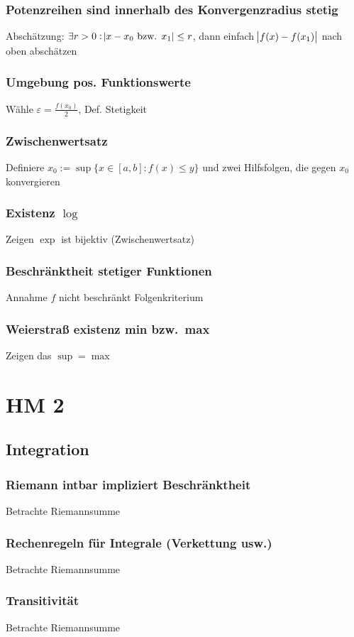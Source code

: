 \subsection{Potenzreihen sind innerhalb des Konvergenzradius stetig }
 Abschätzung: $\exists r>0 : \abs{x-x_0 \text{ bzw. }
 x_1} \leq r$, dann einfach $\abs{f(x)-f(x_1)}$ nach oben abschätzen
\subsection{Umgebung pos. Funktionswerte }
 Wähle $\varepsilon = \frac{f(x_0)}{2}$, Def. Stetigkeit
\subsection{Zwischenwertsatz }
 Definiere $x_0 := \sup \{x \in [a,b] : f(x) \leq y \}$ und zwei Hilfsfolgen, die gegen $x_0$ konvergieren
\subsection{Existenz $\log$ }
 Zeigen $\exp$ ist bijektiv (Zwischenwertsatz)
\subsection{Beschränktheit stetiger Funktionen}
 Annahme $f$ nicht beschränkt Folgenkriterium
\subsection{Weierstraß existenz min bzw.\ max }
 Zeigen das $\sup=\max$

 \chapter{HM 2}
 \section{Integration}
 \subsection{Riemann int\grq bar impliziert Beschränktheit}
 Betrachte Riemannsumme
 \subsection{Rechenregeln für Integrale (Verkettung usw.)}
 Betrachte Riemannsumme
 \subsection{Transitivität}
 Betrachte Riemannsumme
